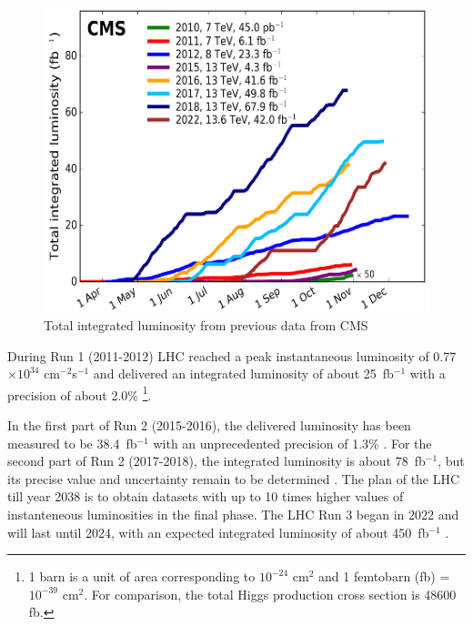 \documentclass[final,12p]{article}
\newcommand{\lumi}[1]{{#1~fb$^{-1}$}}
\newcommand{\instlumi}[1]{#1$\times 10^{34}$ cm$^{-2}$s$^{-1}$}
\begin{document}
\begin{figure}[H]
  \centering
  \includegraphics[width=0.7\columnwidth]{./integratedlum.png}
  \caption{
   Total integrated luminosity from previous data from CMS
  }
  \label{Integrated luminosity}
\end{figure}

During Run 1 (2011-2012) LHC reached a peak instantaneous luminosity of \instlumi{0.77} and delivered an integrated luminosity of about \lumi{25} with a precision of about 2.0\% 
\footnote{1 barn is a unit of area corresponding to $10^{-24}$ cm${^2}$ and 1 femtobarn (fb) = $10^{-39}$ cm$^{2}$. For comparison, the total Higgs production cross section is 48600 fb.}.


In the first part of Run 2 (2015-2016), the delivered luminosity has been measured to be \lumi{38.4} with an unprecedented precision of 1.3\% \cite{Sirunyan:2021qkt}.
For the second part of Run 2 (2017-2018), the integrated luminosity is about \lumi{78}, but its precise value and uncertainty remain to be determined \cite{CMS:2018elu}.
The plan of the LHC till year 2038 is to obtain datasets with up to 10 times higher values of instanteneous luminosities in the final phase.
The LHC Run 3 began in 2022 and will last until 2024, with an expected integrated luminosity of about \lumi{450} \cite{lumi-run3}. 
\end{document}

